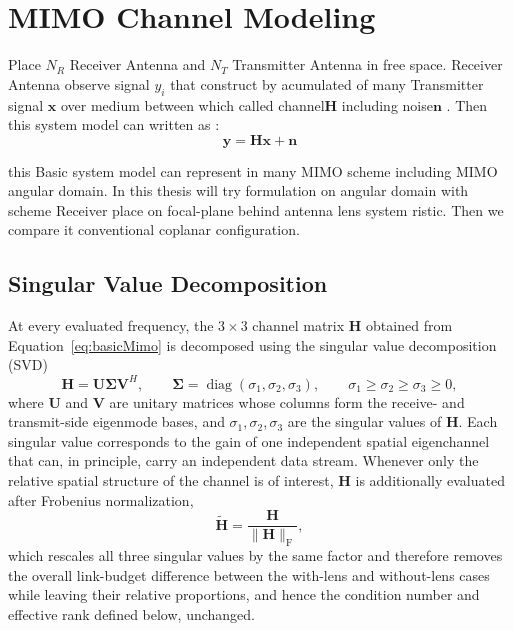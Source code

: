 \section{MIMO Channel Modeling}

Place $N_R$ Receiver Antenna and $N_T$ Transmitter Antenna in free space. Receiver Antenna observe signal $y_i$ that construct by acumulated of many Transmitter signal $\mathbf{x}$ over medium between which called channel$\mathbf{H}$ including noise$\mathbf{n}$ . Then this system model can written as :
\begin{equation}
    \mathbf{y} = \mathbf{H}\mathbf{x} + \mathbf{n}
    \label{eq:basicMimo}
\end{equation}

this Basic system model can represent in many MIMO scheme including MIMO angular domain\cite{Tse2005}\cite{Challita2022}. In this thesis will try formulation on angular domain with scheme Receiver place on focal-plane behind antenna lens system ristic. Then we compare it conventional coplanar configuration.

\subsection{Singular Value Decomposition}
At every evaluated frequency, the $3\times3$ channel matrix $\mathbf{H}$ obtained from Equation~\ref{eq:basicMimo} is decomposed using the singular value decomposition (SVD)
\begin{equation}
    \mathbf{H} = \mathbf{U}\boldsymbol{\Sigma}\mathbf{V}^{H},
    \qquad
    \boldsymbol{\Sigma} = \operatorname{diag}(\sigma_1,\sigma_2,\sigma_3),
    \qquad
    \sigma_1\geq\sigma_2\geq\sigma_3\geq0,
    \label{eq:mimo_svd}
\end{equation}
where $\mathbf{U}$ and $\mathbf{V}$ are unitary matrices whose columns form the receive- and transmit-side eigenmode bases, and $\sigma_1,\sigma_2,\sigma_3$ are the singular values of $\mathbf{H}$. Each singular value corresponds to the gain of one independent spatial eigenchannel that can, in principle, carry an independent data stream. Whenever only the relative spatial structure of the channel is of interest, $\mathbf{H}$ is additionally evaluated after Frobenius normalization,
\begin{equation}
    \widetilde{\mathbf{H}} = \frac{\mathbf{H}}{\lVert\mathbf{H}\rVert_{\mathrm{F}}},
    \label{eq:mimo_frobenius_normalization}
\end{equation}
which rescales all three singular values by the same factor and therefore removes the overall link-budget difference between the with-lens and without-lens cases while leaving their relative proportions, and hence the condition number and effective rank defined below, unchanged.

